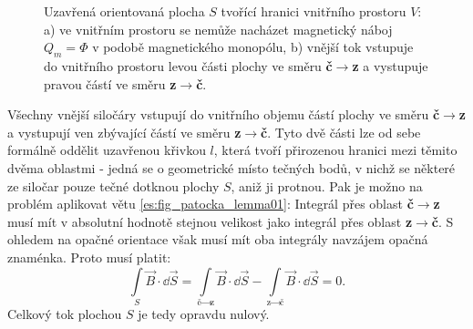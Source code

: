     \begin{figure}[ht!]
      \centering  
      \caption{Uzavřená orientovaná plocha \(S\) tvořící hranici vnitřního prostoru \(V\): a)   
               ve vnitřním prostoru se nemůže nacházet magnetický náboj \(Q_m = \Phi\) v podobě 
               magnetického monopólu, b) vnější tok vstupuje do vnitřního prostoru levou části 
               plochy ve směru \textbf{č\(\rightarrow\)z} a vystupuje pravou částí ve směru 
               \textbf{z\(\rightarrow\)č}.} 
      \label{ES:fig_patocka_mag_tok_exp16}
    \end{figure}

    Všechny vnější siločáry vstupují do vnitřního objemu částí plochy ve směru 
    \textbf{č}\(\rightarrow\)\textbf{z} a vystupují ven zbývající částí ve směru 
    \textbf{z}\(\rightarrow\)\textbf{č}. Tyto dvě části lze od sebe formálně oddělit uzavřenou 
    křivkou \(l\), která tvoří přirozenou hranici mezi těmito dvěma oblastmi - jedná se o 
    geometrické místo tečných bodů, v nichž se některé ze siločar pouze tečné dotknou plochy \(S\), 
    aniž ji protnou. Pak je možno na problém aplikovat větu \ref{es:fig_patocka_lemma01}: Integrál 
    přes oblast \textbf{č}\(\rightarrow\)\textbf{z} musí mít v absolutní hodnotě stejnou 
    velikost jako integrál přes oblast \textbf{z}\(\rightarrow\)\textbf{č}. S ohledem na opačné 
    orientace však musí mít oba integrály navzájem opačná znaménka. Proto musí platit:
    \begin{equation}\label{ES:eq_zakl_elm62}
      \int\limits_{S}\vec{B}\cdot \dd{\vec{S}} = 
      \int\limits_{\text{č}\rightarrow\text{z}}\vec{B}\cdot \dd{\vec{S}} -
      \int\limits_{\text{z}\rightarrow\text{č}}\vec{B}\cdot \dd{\vec{S}} = 0.
    \end{equation} 
    Celkový tok plochou \(S\) je tedy opravdu nulový.
    

